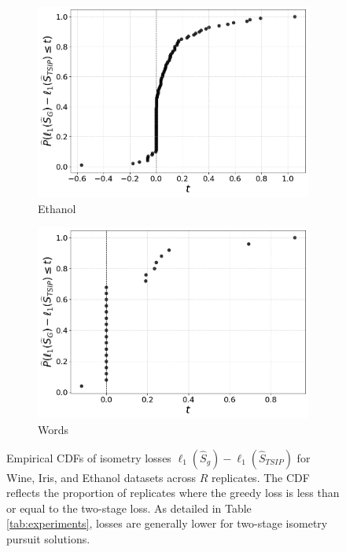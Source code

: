 \begin{figure}[t]
    \begin{subfigure}[b]{0.45\textwidth}
        \centering
        \includegraphics[width=\textwidth]{../figures/ethanol_isometry_losses_ecdf}
        \caption{Ethanol}
        \label{fig:ethanol_isometry_losses}
    \end{subfigure}
    \hfill
    \begin{subfigure}[b]{0.45\textwidth}
        \centering
        \includegraphics[width=\textwidth]{../figures/words_ecdf}
        \caption{Words}
        \label{fig:words_isometry_losses}
    \end{subfigure}
    \caption{Empirical CDFs of isometry losses $\ell_1(\widehat{S}_g) - \ell_1(\widehat{S}_{TSIP})$ for Wine, Iris, and Ethanol datasets across $R$ replicates.
    The CDF reflects the proportion of replicates where the greedy loss is less than or equal to the two-stage loss.
    As detailed in Table \ref{tab:experiments}, losses are generally lower for two-stage isometry pursuit solutions.}
    \label{fig:isometry_losses}
\end{figure}

